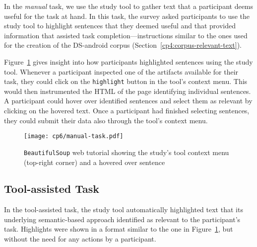 In the \textit{manual} task, we use the study tool to gather text that a participant deems useful for the task at hand. In this task, 
the survey asked participants to use the study tool to highlight sentences that they deemed useful and that provided information that assisted task completion---instructions similar to the ones used for the creation of the \acs{DS-android} corpus (Section~\ref{cp4:corpus-relevant-text}).



Figure~\ref{fig:artifact-pre-highlight}
gives insight into how participants highlighted sentences using the study tool. 
Whenever a participant inspected one of the artifacts available for their task, 
they could click on the \texttt{highlight} button in the tool's context menu.  
This would then instrumented the HTML of the page identifying individual sentences. 
A participant could hover over identified sentences and select them as relevant by clicking on the hovered text.
Once a participant had finished selecting sentences, they could submit 
their data also through the tool's context menu.





\begin{figure}
    \centering
    \texttt{[image: cp6/manual-task.pdf]}
    \caption{\texttt{BeautifulSoup} web tutorial showing the study's tool context menu (top-right corner) and a hovered over sentence}
    \label{fig:artifact-pre-highlight}
\end{figure}




\subsection{Tool-assisted Task}
\label{cp6:procedures-tool-assisted}


In the tool-assisted task, the study tool automatically highlighted text that 
its underlying semantic-based approach identified as relevant to the participant's task.
Highlights were shown in a format similar to the one in Figure~\ref{fig:artifact-pre-highlight}, but without the need for any actions by a participant.






